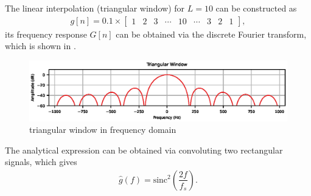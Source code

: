 The linear interpolation (triangular window) for $L=10$ can be constructed as
\begin{gather}
g[n]=0.1\times\begin{bmatrix}
1&2&3&\cdots&10&\cdots&3&2&1
\end{bmatrix},
\end{gather}
its frequency response $G[n]$ can be obtained via the discrete Fourier transform, which is shown in .
\begin{figure}[htb!]
\centering
\includegraphics{PIC/TriangularWindow}
\caption{triangular window in frequency domain}\label{fig:tri_window}
\end{figure}
The analytical expression can be obtained via convoluting two rectangular signals, which gives
\begin{gather}\label{eq:tri_kernel}
\hat{g}\left(f\right)=\text{sinc}^2\left(\dfrac{2f}{f_s}\right).
\end{gather}

